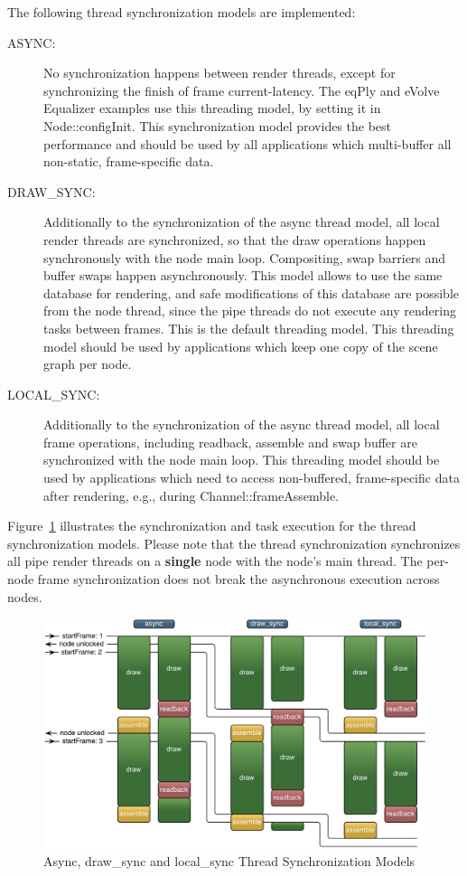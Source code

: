 \documentclass[10pt,a4]{scrartcl}
\newcommand{\fig}[1]{Figure~\ref{#1}}
\begin{document}
The following thread synchronization models are implemented:
\begin{description}
\item[ASYNC:] No synchronization happens between render threads, except
  for synchronizing the finish of frame \textsf{current-latency}. The
  \textsf{eqPly} and \textsf{eVolve} Equalizer examples use this
  threading model, by setting it in \textsf{Node::configInit}. This
  synchronization model provides the best performance and should be used
  by all applications which multi-buffer all non-static, frame-specific
  data.
\item[DRAW\_SYNC:] Additionally to the synchronization of the async thread
  model, all local render threads are synchronized, so that the draw operations
  happen synchronously with the node main loop. Compositing, swap barriers and
  buffer swaps happen asynchronously. This model allows to use the same database
  for rendering, and safe modifications of this database are possible from the
  node thread, since the pipe threads do not execute any rendering tasks between
  frames. This is the default threading model. This threading model should be
  used by applications which keep one copy of the scene graph per node.
\item[LOCAL\_SYNC:] Additionally to the synchronization of the async
  thread model, all local frame operations, including readback, assemble
  and swap buffer are synchronized with the node main loop. This
  threading model should be used by applications which need to access
  non-buffered, frame-specific data after rendering, e.g., during
  \textsf{Channel::frameAssemble}.
\end{description}

\fig{fThreadModels} illustrates the synchronization and task execution
for the thread synchronization models. Please note that the thread
synchronization synchronizes all pipe render threads on a
\textbf{single} node with the node's main thread. The per-node frame
synchronization does not break the asynchronous execution across
nodes.

\begin{figure}[h!t]\center
  \includegraphics[width=.9\textwidth]{images/threadModels.pdf}
  {\caption{\label{fThreadModels}Async, draw\_sync and local\_sync
    Thread Synchronization Models}}
\end{figure}
\end{document}
